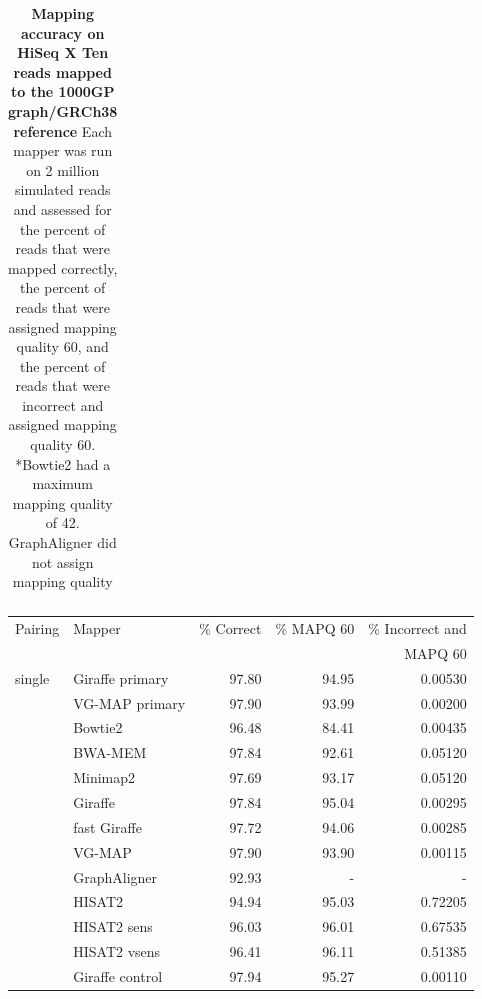 \documentclass[11pt]{ucscthesis}
\begin{document}
\begin{table}[p]
\begin{tabular}{|l|l|r|r|r|}
    \end{tabular}
    \caption[Mapping accuracy on HiSeq X Ten reads mapped to the 1000GP graph/GRCh38 reference]{\textbf{Mapping accuracy on HiSeq X Ten reads mapped to the 1000GP graph/GRCh38 reference} Each mapper was run on 2 million simulated reads and assessed for the percent of reads that were mapped correctly, the percent of reads that were assigned mapping quality 60, and the percent of reads that were incorrect and assigned mapping quality 60. *Bowtie2 had a maximum mapping quality of 42. GraphAligner did not assign mapping quality}
    \label{tab:mapping_accuracy_1kg_hiseqxten}
\end{table}

\begin{table}[p]
    \centering
    \begin{tabular}{|l|l|r|r|r|}
    \hline
        Pairing & Mapper & \% Correct & \% MAPQ 60 & \% Incorrect and \\
               &         &            &            & MAPQ 60          \\
        \hline
        single  & Giraffe primary	& 97.80     & 94.95     & 0.00530 \\
                & VG-MAP primary	& 97.90     & 93.99     & 0.00200 \\
                & Bowtie2	        & 96.48     & 84.41     & 0.00435 \\
                & BWA-MEM       	& 97.84     & 92.61     & 0.05120 \\
                & Minimap2      	& 97.69     & 93.17     & 0.05120 \\
                & Giraffe       	& 97.84     & 95.04     & 0.00295 \\
                & fast Giraffe	    & 97.72     & 94.06     & 0.00285 \\
                & VG-MAP           	& 97.90     & 93.90     & 0.00115 \\
                & GraphAligner 	    & 92.93     & -         & - \\
                & HISAT2        	& 94.94     & 95.03     & 0.72205 \\
                & HISAT2 sens	    & 96.03     & 96.01     & 0.67535 \\
                & HISAT2 vsens  	& 96.41     & 96.11     & 0.51385 \\
                & Giraffe control	& 97.94     & 95.27     & 0.00110 \\


\end{tabular}
\end{table}
\end{document}
